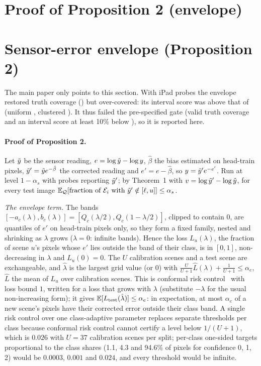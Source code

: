 \documentclass[10pt,twocolumn,letterpaper]{article}
\begin{document}
\ifenvelopemain
\section{Proof of Proposition 2 (envelope)}
\label{supp:proof-env}
\else
\section{Sensor-error envelope (Proposition 2)}
\label{supp:proof-env}
The main paper only points to this section. With iPad probes the envelope restored truth coverage (\NumEnvTruthCov) but over-covered: its interval score was \NumEnvISWorse{} above that of \mDistBoth (uniform \NumEnvISWorseUni, clustered \NumEnvISWorseCluster). It thus failed the pre-specified gate (valid truth coverage and an interval score at least 10\% below \mDistBoth), so it is reported here.

\setcounter{proposition}{1}


\paragraph{Proof of Proposition 2.}
\fi
Let $\tilde{y}$ be the sensor reading, $e=\log\tilde{y}-\log y$, $\hat\beta$ the bias estimated on head-train pixels, $\tilde{y}'=\tilde{y} e^{-\hat\beta}$ the corrected reading and $e'=e-\hat\beta$, so $y=\tilde{y}' e^{-e'}$.
Run \mDual at level $1-\alpha_s$ with probes reporting $\tilde{y}'$; by Theorem~1 with $v=\log\tilde{y}'-\log\hat{y}$, for every test image $\mathbb{E}_{\mathcal{Q}}[\text{fraction of }\mathcal{E}_i\text{ with }\tilde{y}'\notin[\ell,u]]\le\alpha_s$.

\emph{The envelope term.} The bands $[-a_c(\lambda),b_c(\lambda)]=[Q_c(\lambda/2),Q_c(1-\lambda/2)]$, clipped to contain $0$, are quantiles of $e'$ on head-train pixels only, so they form a fixed family, nested and shrinking as $\lambda$ grows ($\lambda=0$: infinite bands).
Hence the loss $L_u(\lambda)$, the fraction of scene $u$'s pixels whose $e'$ lies outside the band of their class, is in $[0,1]$, non-decreasing in $\lambda$ and $L_u(0)=0$.
The $U$ calibration scenes and a test scene are exchangeable, and $\hat\lambda$ is the largest grid value (or $0$) with $\frac{U}{U+1}\hat L(\lambda)+\frac{1}{U+1}\le\alpha_e$, $\hat L$ the mean of $L_u$ over calibration scenes.
This is conformal risk control~\cite{angelopoulos2024crc} with loss bound $1$, written for a loss that grows with $\lambda$ (substitute $-\lambda$ for the usual non-increasing form); it gives $\mathbb{E}[L_{\text{test}}(\hat\lambda)]\le\alpha_e$: in expectation, at most $\alpha_e$ of a new scene's pixels have their corrected error outside their class band.
A single risk control over one class-adaptive parameter replaces separate thresholds per class because conformal risk control cannot certify a level below $1/(U+1)$, which is $0.026$ with $U=37$ calibration scenes per split; per-class one-sided targets proportional to the class shares (1.1, 4.3 and 94.6\% of pixels for confidence 0, 1, 2) would be $0.0003$, $0.001$ and $0.024$, and every threshold would be infinite.
\end{document}

